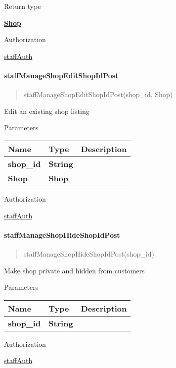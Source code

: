 Return type

\href{../Models/Shop.md}{\textbf{Shop}}

Authorization

\href{../README.md\#staffAuth}{staffAuth}

\hypertarget{staffmanageshopeditshopidpost}{%
\paragraph{\texorpdfstring{\textbf{staffManageShopEditShopIdPost}}{staffManageShopEditShopIdPost}}\label{staffmanageshopeditshopidpost}}

\begin{quote}
staffManageShopEditShopIdPost(shop\_id, Shop)
\end{quote}

Edit an existing shop listing

Parameters

\begin{longtable}[]{@{}lll@{}}
\toprule
Name & Type & Description\tabularnewline
\midrule
\endhead
\textbf{shop\_id} & \textbf{String} &\tabularnewline
\textbf{Shop} & \href{../Models/Shop.md}{\textbf{Shop}} &\tabularnewline
\bottomrule
\end{longtable}

Authorization

\href{../README.md\#staffAuth}{staffAuth}

\hypertarget{staffmanageshophideshopidpost}{%
\paragraph{\texorpdfstring{\textbf{staffManageShopHideShopIdPost}}{staffManageShopHideShopIdPost}}\label{staffmanageshophideshopidpost}}

\begin{quote}
staffManageShopHideShopIdPost(shop\_id)
\end{quote}

Make shop private and hidden from customers

Parameters

\begin{longtable}[]{@{}lll@{}}
\toprule
Name & Type & Description\tabularnewline
\midrule
\endhead
\textbf{shop\_id} & \textbf{String} &\tabularnewline
\bottomrule
\end{longtable}

Authorization

\href{../README.md\#staffAuth}{staffAuth}

